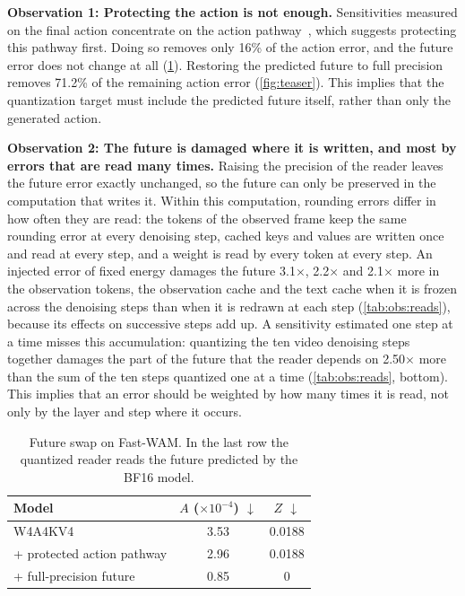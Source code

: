 \noindent\textbf{Observation 1: Protecting the action is not enough.}
Sensitivities measured on the final action concentrate on the action pathway~\cite{akbari2026qwam}, which suggests protecting this pathway first.
Doing so removes only 16\% of the action error, and the future error does not change at all (\cref{tab:obs:swap}).
Restoring the predicted future to full precision removes 71.2\% of the remaining action error (\cref{fig:teaser}).
This implies that the quantization target must include the predicted future itself, rather than only the generated action.

\noindent\textbf{Observation 2: The future is damaged where it is written, and most by errors that are read many times.}
Raising the precision of the reader leaves the future error exactly unchanged, so the future can only be preserved in the computation that writes it.
Within this computation, rounding errors differ in how often they are read: the tokens of the observed frame keep the same rounding error at every denoising step, cached keys and values are written once and read at every step, and a weight is read by every token at every step.
An injected error of fixed energy damages the future 3.1$\times$, 2.2$\times$ and 2.1$\times$ more in the observation tokens, the observation cache and the text cache when it is frozen across the denoising steps than when it is redrawn at each step (\cref{tab:obs:reads}), because its effects on successive steps add up.
A sensitivity estimated one step at a time misses this accumulation: quantizing the ten video denoising steps together damages the part of the future that the reader depends on 2.50$\times$ more than the sum of the ten steps quantized one at a time (\cref{tab:obs:reads}, bottom).
This implies that an error should be weighted by how many times it is read, not only by the layer and step where it occurs.

\begin{table}[t]
  \centering
  \small
  \setlength{\tabcolsep}{5pt}
  \begin{tabular}{@{}lcc@{}}
    \toprule
    Model & $A$ ($\times 10^{-4}$) $\downarrow$ & $Z$ $\downarrow$ \\
    \midrule
    W4A4KV4                           & 3.53 & 0.0188 \\
    \quad + protected action pathway  & 2.96 & 0.0188 \\
    \quad + full-precision future     & 0.85 & 0 \\
    \bottomrule
  \end{tabular}
  \caption{Future swap on Fast-WAM. In the last row the quantized reader reads the future predicted by the BF16 model.}
  \label{tab:obs:swap}
\end{table}


